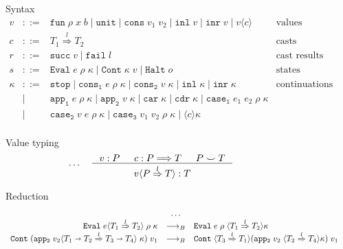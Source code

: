 \documentclass[acmsmall,review,anonymous]{acmart}\settopmatter{printfolios=true,printccs=false,printacmref=false}
\newcommand{\stxrule}[3]{#1 & ::= & #3 & \text{#2}\\}
\newcommand{\stxrulecont}[1]{& | & #1 & \\}
\newcommand{\redrule}[3]{#1 & \longrightarrow_B & #2 & #3\\}
\newcommand{\sOOinspect}[3]{\mathtt{Eval} \; #1 \; #2 \; #3}
\newcommand{\sOOreturn}[2]{\mathtt{Cont} \; #2 \; #1}
\newcommand{\sOOhalt}[1]{\mathtt{Halt} \; #1}
\newcommand{\POOfun}[2]{#1 \shortrightarrow #2}
\newcommand{\eOOcast}[4]{#1 \langle \cOOcast{#2}{#3}{#4} \rangle}
\newcommand{\cOOcast}[3]{#1 \overset{#2}{\Rightarrow} #3}
\newcommand{\vOOcast}[2]{#1\langle#2\rangle}
\newcommand{\vOOfun}[3]{\mathtt{fun} \; #1 \; #2 \; #3}
\newcommand{\vOOtt}[0]{\mathtt{unit}}
\newcommand{\vOOcons}[2]{\mathtt{cons}\;#1\;#2}
\newcommand{\vOOinl}[1]{\mathtt{inl}\;#1}
\newcommand{\vOOinr}[1]{\mathtt{inr}\;#1}
\newcommand{\rOOsucc}[1]{\mathtt{succ}\;#1}
\newcommand{\rOOfail}[1]{\mathtt{fail}\;#1}
\begin{document}
\begin{figure}
	Syntax
	\[
	\begin{array}{rclr}
	
	\stxrule{v}{values}{
		\vOOfun{\rho}{x}{b} \mid
		\vOOtt{} \mid
		\vOOcons{v_1}{v_2} \mid
		\vOOinl{v} \mid
		\vOOinr{v} \mid		
		\vOOcast{v}{c}
	}
	\stxrule{c}{casts}{
		\cOOcast{T_1}{l}{T_2}
	}
	\stxrule{r}{cast results}{
		\rOOsucc{v} \mid
		\rOOfail{l}
	}
	\stxrule{s}{states}{
		\sOOinspect{e}{\rho}{\kappa} \mid{}
		\sOOreturn{v}{\kappa} \mid{}
		\sOOhalt{o}
	}
		
	\stxrule{\kappa}{continuations}{
		\mathtt{stop} \mid{}
		\mathtt{cons_1} \; e \; \rho \; \kappa \mid{}
		\mathtt{cons_2} \; v \; \kappa \mid{}
		\mathtt{inl} \; \kappa \mid{}
		\mathtt{inr} \; \kappa
	}
	\stxrulecont{
		\mathtt{app_1} \; e \; \rho \; \kappa \mid{}
		\mathtt{app_2} \; v \; \kappa \mid{}
		\mathtt{car} \; \kappa \mid{}
		\mathtt{cdr} \; \kappa \mid
		\mathtt{case_1} \; e_1 \; e_2 \; \rho \; \kappa
	}
	\stxrulecont{	
		\mathtt{case_2} \; v   \; e   \; \rho \; \kappa \mid{}
		\mathtt{case_3} \; v_1 \; v_2 \; \rho \; \kappa \mid
		\langle c \rangle \kappa
	}
	\end{array}
	\]
	
	Value typing 
	\begin{gather*}
	\dots \quad
	\inference{
		v : P &
		c : P \Longrightarrow T &
		P \smile T
	}{
		\vOOcast{v}{\cOOcast{P}{l}{T}} : T
	}
	\end{gather*}
	
	
	Reduction 
	\[
	\begin{array}{rclr}
	
	& \dots \\
	\redrule{
		\sOOinspect{\eOOcast{e}{T_1}{l}{T_2}}{\rho}{\kappa}
	}{
		\sOOinspect{e}{\rho}{\langle\cOOcast{T_1}{l}{T_2}\rangle\kappa}
	}{}
	\redrule{
		\sOOreturn{v_1}{(\mathtt{app_2} \; \vOOcast{v_2}{
				\cOOcast{\POOfun{T_1}{T_2}}{l}{\POOfun{T_3}{T_4}}
			} \; \kappa)}
	}{
		\sOOreturn{v_1}{
		\langle\cOOcast{T_3}{l}{T_1}\rangle
		(\mathtt{app_2} \; v_2 \; 
		\langle\cOOcast{T_2}{l}{T_4}\rangle \kappa)}
	}{}
	

\end{array}\]
\end{figure}
\end{document}
